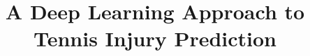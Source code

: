 \documentclass[manuscript,acmsmall,anonymous,review,screen,nonacm=true, authorversion=true]{acmart}
\begin{document}
\title{A Deep Learning Approach to Tennis Injury Prediction}









\renewcommand{\shortauthors}{Trovato and Tobin, et al.}
\end{document}
